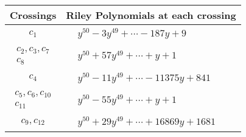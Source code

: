 \documentclass[1p]{elsarticle_modified}
\theoremstyle{definition}
\begin{document}
\begin{tabular}{m{50pt}|m{274pt}}
Crossings & \hspace{64pt}Riley Polynomials at each crossing \\
\hline $$\begin{aligned}c_{1}\end{aligned}$$&$\begin{aligned}
&y^{50}-3 y^{49}+\cdots-187 y+9
\end{aligned}$\\
\hline $$\begin{aligned}c_{2},c_{3},c_{7}\\c_{8}\end{aligned}$$&$\begin{aligned}
&y^{50}+57 y^{49}+\cdots+y+1
\end{aligned}$\\
\hline $$\begin{aligned}c_{4}\end{aligned}$$&$\begin{aligned}
&y^{50}-11 y^{49}+\cdots-11375 y+841
\end{aligned}$\\
\hline $$\begin{aligned}c_{5},c_{6},c_{10}\\c_{11}\end{aligned}$$&$\begin{aligned}
&y^{50}-55 y^{49}+\cdots+y+1
\end{aligned}$\\
\hline $$\begin{aligned}c_{9},c_{12}\end{aligned}$$&$\begin{aligned}
&y^{50}+29 y^{49}+\cdots+16869 y+1681
\end{aligned}$\\
\hline
\end{tabular}
\vskip 2pc
\end{document}

